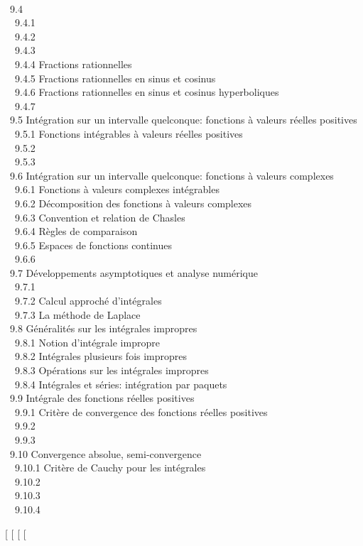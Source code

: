 \\ ~9.4 
\\ ~~9.4.1 
\\ ~~9.4.2 
\\ ~~9.4.3 
\\ ~~9.4.4 {Fractions
rationnelles} \\ ~~9.4.5
{Fractions rationnelles en sinus
et cosinus} \\ ~~9.4.6 {Fractions
rationnelles en sinus et cosinus hyperboliques} \\ ~~9.4.7
 \\ ~9.5
{Intégration sur un intervalle
quelconque: fonctions à valeurs réelles positives} \\ ~~9.5.1
{Fonctions intégrables à valeurs
réelles positives} \\ ~~9.5.2
 \\ ~~9.5.3
 \\ ~9.6
{Intégration sur un intervalle
quelconque: fonctions à valeurs complexes} \\ ~~9.6.1
{Fonctions à valeurs complexes
intégrables} \\ ~~9.6.2
{Décomposition des fonctions à
valeurs complexes} \\ ~~9.6.3
{Convention et relation de
Chasles} \\ ~~9.6.4 {Règles de
comparaison} \\ ~~9.6.5 {Espaces
de fonctions continues} \\ ~~9.6.6
 \\
~9.7 {Développements asymptotiques
et analyse numérique} \\ ~~9.7.1
 \\
~~9.7.2 {Calcul approché
d'intégrales} \\ ~~9.7.3 {La
méthode de Laplace} \\ ~9.8
{Généralités sur les intégrales
impropres} \\ ~~9.8.1 {Notion
d'intégrale impropre} \\ ~~9.8.2
{Intégrales plusieurs fois
impropres} \\ ~~9.8.3 {Opérations
sur les intégrales impropres} \\ ~~9.8.4
{Intégrales et séries: intégration
par paquets} \\ ~9.9 {Intégrale des
fonctions réelles positives} \\ ~~9.9.1
{Critère de convergence des
fonctions réelles positives} \\ ~~9.9.2
 \\ ~~9.9.3
 \\ ~9.10
{Convergence absolue,
semi-convergence} \\ ~~9.10.1
{Critère de Cauchy pour les
intégrales} \\ ~~9.10.2
 \\ ~~9.10.3
 \\
~~9.10.4 

{[}
{[}
{[}
{[}
